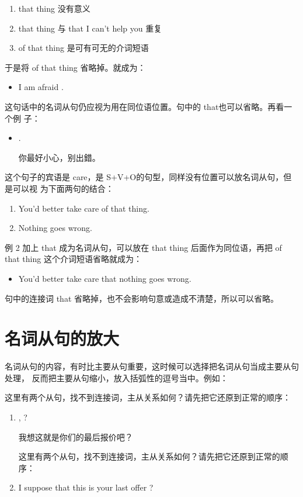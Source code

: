 \begin{enumerate}
\item that thing 没有意义
\item that thing 与 that I can't help you 重复
\item of that thing 是可有可无的介词短语
\end{enumerate}
于是将 of that thing 省略掉。就成为：
\begin{itemize}
\item I am afraid .
\end{itemize}
这句话中的名词从句仍应视为用在同位语位置。句中的 that也可以省略。再看一个例
子：
\begin{itemize}
\item {}   .

  你最好小心，别出錯。
\end{itemize}
这个句子的宾语是 care，是 S+V+O的句型，同样没有位置可以放名词从句，但是可以视
为下面两句的结合：
\begin{enumerate}
\item   You'd better take care of that thing.
\item   Nothing goes wrong.
\end{enumerate}
例 2 加上 that 成为名词从句，可以放在 that thing 后面作为同位语，再把 of
that thing 这个介词短语省略就成为：
\begin{itemize}
\item   You'd better take care that nothing goes wrong.
\end{itemize}
句中的连接词 that 省略掉，也不会影响句意或造成不清楚，所以可以省略。

\section{名词从句的放大}

名词从句的内容，有时比主要从句重要，这时候可以选择把名词从句当成主要从句处理，
反而把主要从句缩小，放入括弧性的逗号当中。例如：

这里有两个从句，找不到连接词，主从关系如何？请先把它还原到正常的顺序：
\begin{enumerate}
\item {}  , 
  ?

  我想这就是你们的最后报价吧？

  这里有两个从句，找不到连接词，主从关系如何？请先把它还原到正常的顺序：

\item   I suppose that this is your last offer ?
\end{enumerate}

